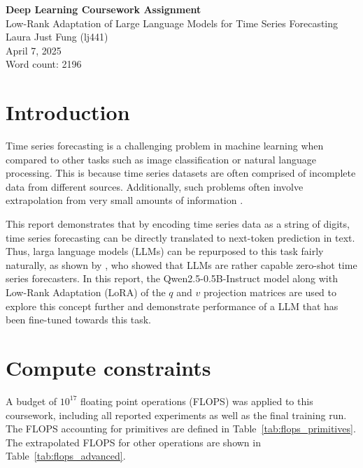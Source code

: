 \documentclass[11pt,a4paper]{article}
\begin{document}
 

\begin{center}
    \LARGE{\textbf{Deep Learning Coursework Assignment}}
    \\
    \Large{{Low-Rank Adaptation of Large Language Models for Time Series Forecasting}}
    \\
    \large{Laura Just Fung (lj441)}
    \\
    April 7, 2025
    \\
    Word count: 2196
\end{center}

\section{Introduction}
Time series forecasting is a challenging problem in machine learning when compared to other tasks such as image classification or natural language processing. This is because time series datasets are often comprised of incomplete data from different sources. Additionally, such problems often involve extrapolation from very small amounts of information \citep{gruver2024largelanguagemodelszeroshot}.

This report demonstrates that by encoding time series data as a string of digits, time series forecasting can be directly translated to next-token prediction in text. Thus, larga language models (LLMs) can be repurposed to this task fairly naturally, as shown by \citeauthor{gruver2024largelanguagemodelszeroshot}, who showed that LLMs are rather capable zero-shot time series forecasters. In this report, the Qwen2.5-0.5B-Instruct model \citep{yang2024qwen2technicalreport} along with Low-Rank Adaptation (LoRA) of the $q$ and $v$ projection matrices are used to explore this concept further and demonstrate performance of a LLM that has been fine-tuned towards this task.

\section{Compute constraints}
\label{sec:constraints}
A budget of $10^{17}$ floating point operations (FLOPS) was applied to this coursework, including all reported experiments as well as the final training run. The FLOPS accounting for primitives are defined in Table~\ref{tab:flops_primitives}. The extrapolated FLOPS for other operations are shown in Table~\ref{tab:flops_advanced}.
\end{document}
